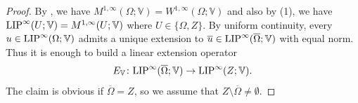 \documentclass[reqno]{amsart}
\newcommand{\LIP}{{\rm LIP}}
\numberwithin{equation}{section}
\theoremstyle{remark}
\begin{document}
\begin{proof}
By , we have $M^{1,\infty}(\Omega;\mathbb V)=W^{1,\infty}(\Omega;\mathbb V)$ and also by  (1), we have $\LIP^{\infty}( U; \mathbb{V} ) = M^{1,\infty}( U; \mathbb{V} )$ where $U \in \{ \Omega, Z \}$. By uniform continuity, every $u \in \LIP^{\infty}(\Omega; \mathbb{V})$ admits a unique extension to $\overline{u} \in \LIP^{\infty}( \overline{\Omega}; \mathbb{V} )$ with equal norm. Thus it is enough to build a linear extension operator
\begin{equation}\label{eq:EXT-LIP-BANACH}
E_{\mathbb V}\colon \LIP^{\infty}(\overline{\Omega};\mathbb V)\to \LIP^{\infty}(Z;\mathbb V).
\end{equation}
The claim is obvious if $\overline{\Omega} = Z$, so we assume that $Z \setminus \overline{\Omega} \neq \emptyset$.


\end{proof}
\end{document}
